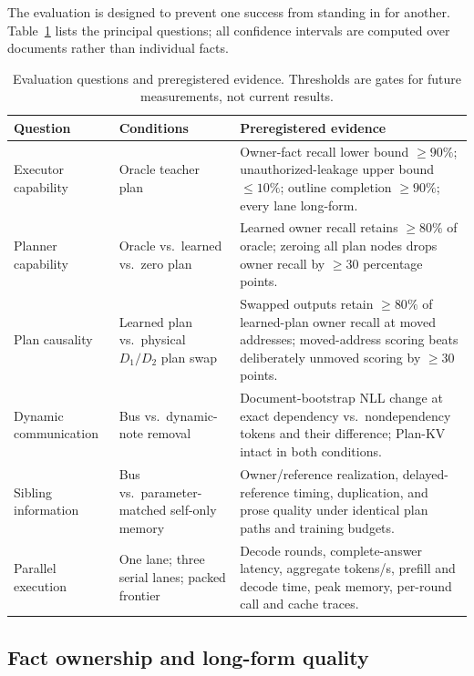 \documentclass[10pt]{article}
\begin{document}
The evaluation is designed to prevent one success from standing in for
another. Table~\ref{tab:gates} lists the principal questions; all confidence
intervals are computed over documents rather than individual facts.

\begin{table}[htbp]
\centering
\small
\begin{tabularx}{\textwidth}{
>{\raggedright\arraybackslash}p{}
>{\raggedright\arraybackslash}p{}
>{\raggedright\arraybackslash}X}
\toprule
Question & Conditions & Preregistered evidence \\
\midrule
Executor capability &
Oracle teacher plan &
Owner-fact recall lower bound \(\geq90\%\); unauthorized-leakage upper bound
\(\leq10\%\); outline completion \(\geq90\%\); every lane long-form. \\
Planner capability &
Oracle vs.\ learned vs.\ zero plan &
Learned owner recall retains \(\geq80\%\) of oracle; zeroing all plan nodes
drops owner recall by \(\geq30\) percentage points. \\
Plan causality &
Learned plan vs.\ physical \(D_1/D_2\) plan swap &
Swapped outputs retain \(\geq80\%\) of learned-plan owner recall at moved
addresses; moved-address scoring beats deliberately unmoved scoring by
\(\geq30\) points. \\
Dynamic communication &
Bus vs.\ dynamic-note removal &
Document-bootstrap NLL change at exact dependency vs.\ nondependency tokens
and their difference; Plan-KV intact in both conditions. \\
Sibling information &
Bus vs.\ parameter-matched self-only memory &
Owner/reference realization, delayed-reference timing, duplication, and
prose quality under identical plan paths and training budgets. \\
Parallel execution &
One lane; three serial lanes; packed frontier &
Decode rounds, complete-answer latency, aggregate tokens/s, prefill and
decode time, peak memory, per-round call and cache traces. \\
\bottomrule
\end{tabularx}
\caption{Evaluation questions and preregistered evidence. Thresholds are
gates for future measurements, not current results.}
\label{tab:gates}
\end{table}

\subsection{Fact ownership and long-form quality}
\end{document}
